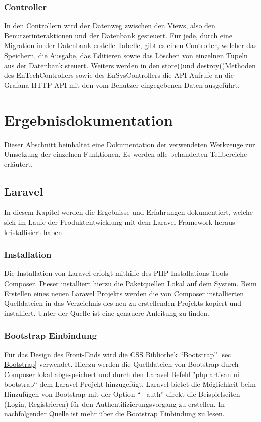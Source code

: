 \subsection{Controller}
In den Controllern wird der Datenweg zwischen den Views, also den Benutzerinteraktionen und der Datenbank gesteuert. Für jede, durch eine Migration in der Datenbank erstelle Tabelle, gibt es einen Controller, welcher das Speichern, die Ausgabe, das Editieren sowie das Löschen von einzelnen Tupeln aus der Datenbank steuert. Weiters werden in den \glqq store()\grqq \space und  \glqq destroy()\grqq \space Methoden des EnTechControllers sowie des EnSysControllers die API Aufrufe an die Grafana HTTP API mit den vom Benutzer eingegebenen Daten ausgeführt.

\chapter{Ergebnisdokumentation }
Dieser Abschnitt beinhaltet eine Dokumentation der verwendeten Werkzeuge zur Umsetzung der einzelnen Funktionen. Es werden alle behandelten Teilbereiche erläutert.

\section{Laravel }
In diesem Kapitel werden die Ergebnisse und Erfahrungen dokumentiert, welche sich im Laufe der Produktentwicklung mit dem Laravel Framework heraus kristallisiert haben.

\subsection{Installation}
Die Installation von Laravel erfolgt mithilfe des PHP Installations Tools Composer. Dieser installiert hierzu die Paketquellen Lokal auf dem System. Beim Erstellen eines neuen Laravel Projekts werden die von Composer installierten Quelldateien in das Verzeichnis des neu zu erstellenden Projekts kopiert und installiert. Unter der Quelle \cite{Kron1} ist eine genauere Anleitung zu finden.



\subsection{Bootstrap Einbindung}
Für das Design des Front-Ends wird die CSS Bibliothek “Bootstrap” \ref{sec Bootstrap} verwendet. Hierzu werden die Quelldateien von Bootstrap durch Composer lokal abgespeichert und durch den Laravel Befehl "php artisan ui bootstrap“ dem Laravel Projekt hinzugefügt. Laravel bietet die Möglichkeit beim Hinzufügen von Bootstrap mit der Option “-- auth” direkt die Beispielseiten (Login, Registrieren) für den Authentifizierungsvorgang zu erstellen. In nachfolgender Quelle \cite{Kron2} ist mehr über die Bootstrap Einbindung zu lesen.
